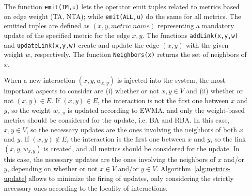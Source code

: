 
The function \texttt{emit(TM,u)} lets the operator emit tuples related to metrics based on edge weight (TA, NTA); while \texttt{emit(ALL,u)} do the same for all metrics.
%
The emitted tuples are defined as $(x,y,metric\; name)$ representing a mandatory update of the specified metric for the edge $x,y$.
%
The functions \texttt{addLink(x,y,w)} and \texttt{updateLink(x,y,w)} create and update the edge $(x,y)$ with the given weight $w$, respectively.
%
The function \texttt{Neighbors(x)} returns the set of neighbors of $x$.

When a new interaction $(x,y,w_{x,y})$ is injected into the system, the most important aspects to consider are (i) whether or not $x,y\in V$ and (ii) whether or not $(x,y)\in E$.
%
If $(x,y)\in E$, the interaction is not the first one between $x$ and $y$, so the weight $w_{x,y}$ is updated according to EWMA, and only the weight-based metrics should be considered for the update, i.e. BA and RBA.
%
In this case, $x,y\in V$, so the necessary updates are the ones involving the neighbors of both $x$ and $y$.
%
If $(x,y)\notin E$, the interaction is the first one between $x$ and $y$, so the link $(x,y,w_{x,y})$ is created, and all metrics should be considered for the update.
%
In this case, the necessary updates are the ones involving the neighbors of $x$ and/or $y$, depending on whether or not $x\in V$ and/or $y\in V$.
%
Algorithm~\ref{alg:metrics-update} allows to minimize the firing of updates, only considering the strictly necessary ones according to the locality of interactions.
